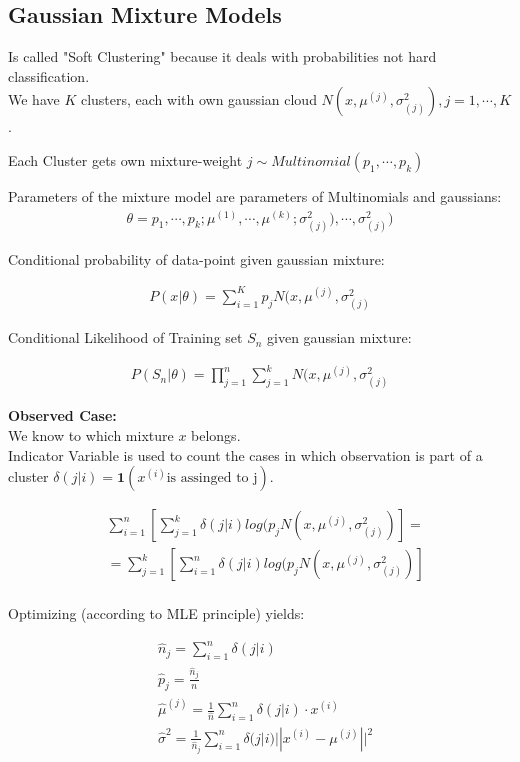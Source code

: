 \subsection{Gaussian Mixture Models}
Is called "Soft Clustering" because it  deals with probabilities not hard classification.\\

We have $K$ clusters, each with own gaussian cloud $N(x, \mu^{(j)}, \sigma^2_{(j)}), j=1,\cdots,K$. 

Each Cluster gets own mixture-weight $j \sim Multinomial(p_1,\cdots,p_k)$ 

Parameters of the mixture model are parameters of Multinomials and gaussians: 
\begin{align*}
\theta={p_1,\cdots,p_k;\mu^{(1)},\cdots,\mu^{(k)};\sigma^2_{(j)}),\cdots,\sigma^2_{(j)})}
\end{align*}

Conditional probability of data-point given gaussian mixture:

\begin{align*}
P(x|\theta)=\sum_{i=1}^K p_j N(x,\mu^{(j)},\sigma^2_{(j)}
\end{align*}

Conditional Likelihood of Training set $S_n$ given gaussian mixture:

\begin{align*}
P(S_n|\theta)= \prod_{j=1}^{n} \sum_{j=1}^{k} N(x,\mu^{(j)},\sigma^2_{(j)}
\end{align*}

\textbf{Observed Case:}\\
We know to which mixture $x$ belongs.\\

Indicator Variable is used to count the cases in which observation is part of a cluster $\delta(j|i)=\textbf{1}(x^{(i)} \text{is assinged to j})$.


\begin{align*}
&\sum_{i=1}^n [\sum_{j=1}^k \delta(j|i) log (p_j N(x,\mu^{(j)},\sigma^2_{(j)})]=\\
&= \sum_{j=1}^k [\sum_{i=1}^n \delta(j|i) log (p_j N(x,\mu^{(j)},\sigma^2_{(j)})]\\
\end{align*}

Optimizing (according to MLE principle) yields:

\begin{align*}
&\hat{n}_j = \sum_{i=1}^n \delta(j|i)\\
&\hat{p}_j = \frac{\hat{n}_j}{n}\\
&\hat{\mu}^{(j)}= \frac{1}{\hat{n}} \sum
_{i=1}^n \delta(j|i) \cdot x^{(i)}\\
&\hat{\sigma}^2 = \frac{1}{\hat{n}_j}\sum_{i=1}^n \delta(j|i) || x^{(i)} - \mu^{(j)}||^2
\end{align*}

